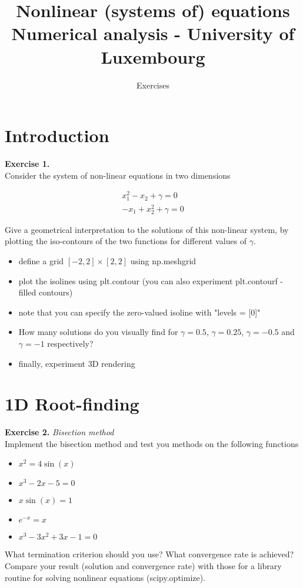 \documentclass{article}
\title{Nonlinear (systems of) equations \\[1ex] \large Numerical analysis - University of Luxembourg}
\author{Exercises}
\date{}
\begin{document}
\maketitle


\section*{Introduction}

\noindent \textbf{Exercise 1.} \textit{} \\

Consider the system of non-linear equations in two dimensions

\begin{align*}
    x_1^2 - x_2 + \gamma = 0 \\
    -x_1 + x_2^2 + \gamma = 0
\end{align*}

Give a geometrical interpretation to the solutions of this non-linear system, by plotting the iso-contours of the two functions for different values of $\gamma$.
\begin{itemize}
\item define a grid $[-2,2] \times [2,2]$ using np.meshgrid
\item plot the isolines using plt.contour (you can also experiment plt.contourf - filled contours) 
\item note that you can specify the zero-valued isoline with "levels = [0]"
\item How many solutions do you visually find for $\gamma=0.5$, $\gamma=0.25$, $\gamma=-0.5$ and $\gamma=-1$ respectively?
\item finally, experiment 3D rendering
\end{itemize}

\section*{1D Root-finding}

\noindent \textbf{Exercise 2.} \textit{Bisection method} \\
Implement the bisection method and test you methods on the following functions
\begin{itemize}
    \item $x^2 = 4\sin(x) $
    \item $x^3 -2x -5 = 0$
    \item $x \sin(x) = 1$
    \item $e^{-x} = x$
    \item $ x^3 - 3x^2 + 3x -1 = 0$
\end{itemize}
What termination criterion should you use? What convergence rate is achieved? Compare your result (solution and convergence rate) with those for a library routine for solving nonlinear equations (scipy.optimize).
\end{document}
